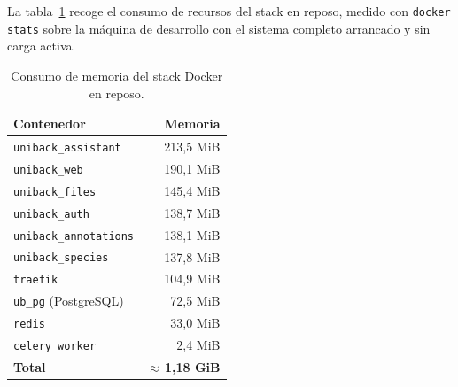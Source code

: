 La tabla~\ref{tab:recursos} recoge el consumo de recursos del stack en reposo,
medido con \texttt{docker stats} sobre la máquina de desarrollo con el sistema
completo arrancado y sin carga activa.

\begin{table}[!htbp]
\caption{Consumo de memoria del stack Docker en reposo.}
\label{tab:recursos}
\centering
\begin{tabular}{|p{5.5cm}|r|}
\hline
\textbf{Contenedor} & \textbf{Memoria} \\ \hline
\texttt{uniback\_assistant} & 213{,}5 MiB \\ \hline
\texttt{uniback\_web} & 190{,}1 MiB \\ \hline
\texttt{uniback\_files} & 145{,}4 MiB \\ \hline
\texttt{uniback\_auth} & 138{,}7 MiB \\ \hline
\texttt{uniback\_annotations} & 138{,}1 MiB \\ \hline
\texttt{uniback\_species} & 137{,}8 MiB \\ \hline
\texttt{traefik} & 104{,}9 MiB \\ \hline
\texttt{ub\_pg} (PostgreSQL) & 72{,}5 MiB \\ \hline
\texttt{redis} & 33{,}0 MiB \\ \hline
\texttt{celery\_worker} & 2{,}4 MiB \\ \hline
\textbf{Total} & \textbf{$\approx$\,1{,}18 GiB} \\ \hline
\end{tabular}
\end{table}
